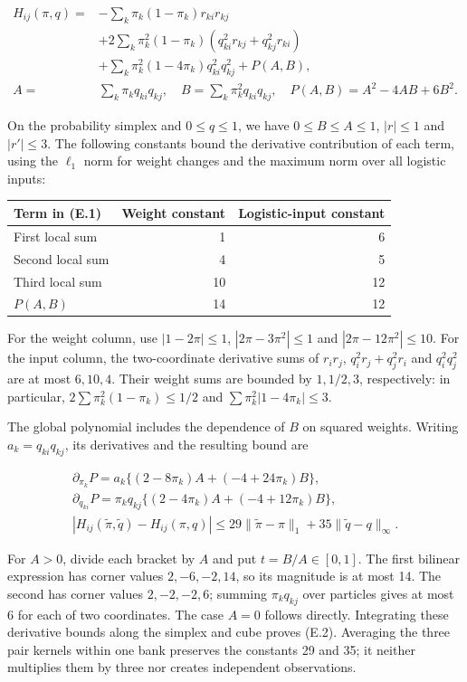 \documentclass{article}
\begin{document}
\[
\begin{aligned}
H_{ij}(\pi,q)={}&-\sum_k\pi_k(1-\pi_k)r_{ki}r_{kj}\\
&+2\sum_k\pi_k^2(1-\pi_k)(q_{ki}^2r_{kj}+q_{kj}^2r_{ki})\\
&+\sum_k\pi_k^2(1-4\pi_k)q_{ki}^2q_{kj}^2+P(A,B),\\
A={}&\sum_k\pi_kq_{ki}q_{kj},\quad B=\sum_k\pi_k^2q_{ki}q_{kj},\quad
P(A,B)=A^2-4AB+6B^2.
\end{aligned}
\tag{E.1}
\]

On the probability simplex and \(0\le q\le1\), we have
\(0\le B\le A\le1\), \(|r|\le1\) and \(|r'|\le3\). The following
constants bound the derivative contribution of each term, using the
\(\ell_1\) norm for weight changes and the maximum norm over all
logistic inputs:

\begin{longtable}[]{@{}lrr@{}}
\toprule\noalign{}
Term in (E.1) & Weight constant & Logistic-input constant \\
\midrule\noalign{}
\endhead
\bottomrule\noalign{}
\endlastfoot
First local sum & 1 & 6 \\
Second local sum & 4 & 5 \\
Third local sum & 10 & 12 \\
\(P(A,B)\) & 14 & 12 \\
\end{longtable}

For the weight column, use \(|1-2\pi|\le1\), \(|2\pi-3\pi^2|\le1\) and
\(|2\pi-12\pi^2|\le10\). For the input column, the two-coordinate
derivative sums of \(r_ir_j\), \(q_i^2r_j+q_j^2r_i\) and \(q_i^2q_j^2\)
are at most \(6,10,4\). Their weight sums are bounded by \(1,1/2,3\),
respectively: in particular, \(2\sum\pi_k^2(1-\pi_k)\le1/2\) and
\(\sum\pi_k^2|1-4\pi_k|\le3\).

The global polynomial includes the dependence of \(B\) on squared
weights. Writing \(a_k=q_{ki}q_{kj}\), its derivatives and the resulting
bound are

\[
\begin{gathered}
\partial_{\pi_k}P=a_k\{(2-8\pi_k)A+(-4+24\pi_k)B\},\\
\partial_{q_{ki}}P=\pi_kq_{kj}\{(2-4\pi_k)A+(-4+12\pi_k)B\},\\
|H_{ij}(\widetilde\pi,\widetilde q)-H_{ij}(\pi,q)|
\le29\|\widetilde\pi-\pi\|_1+35\|\widetilde q-q\|_\infty.
\end{gathered}
\tag{E.2}
\]

For \(A>0\), divide each bracket by \(A\) and put \(t=B/A\in[0,1]\). The
first bilinear expression has corner values \(2,-6,-2,14\), so its
magnitude is at most 14. The second has corner values \(2,-2,-2,6\);
summing \(\pi_kq_{kj}\) over particles gives at most 6 for each of two
coordinates. The case \(A=0\) follows directly. Integrating these
derivative bounds along the simplex and cube proves (E.2). Averaging the
three pair kernels within one bank preserves the constants 29 and 35; it
neither multiplies them by three nor creates independent observations.
\end{document}
